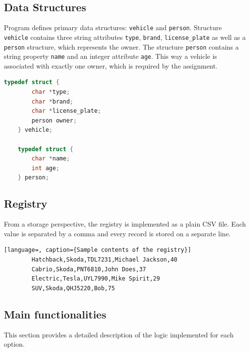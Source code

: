\documentclass[12pt, a4paper]{article}
\begin{document}
\subsection{Data Structures}

Program defines primary data structures: \texttt{vehicle} and \texttt{person}.
Structure \texttt{vehicle} contains three string attributes \texttt{type}, \texttt{brand}, \texttt{license\_plate}
as well as a \texttt{person} structure, which represents the owner.
The structure \texttt{person} contains a string property \texttt{name} and an integer attribute \texttt{age}. 
This way a vehicle is associated with exactly one owner, which is required by the assignment.

    \begin{lstlisting}[language=C, caption={Definition of data structures}]
    typedef struct {
        char *type;
        char *brand;
        char *license_plate;
        person owner;
    } vehicle;
    
    typedef struct {
        char *name;
        int age;
    } person;
    \end{lstlisting}

\subsection{Registry}

From a storage perspective, the registry is implemented as a plain CSV file. Each value is separated by a comma and every record is stored on a separate line.

    \begin{lstlisting}[language=, caption={Sample contents of the registry}]
        Hatchback,Skoda,TDL7231,Michael Jackson,40
        Cabrio,Skoda,PNT6810,John Does,37
        Electric,Tesla,UYL7990,Mike Spirit,29
        SUV,Skoda,QHJ5220,Bob,75
    \end{lstlisting}

\subsection{Main functionalities}

This section provides a detailed description of the logic implemented for each option.
\end{document}
